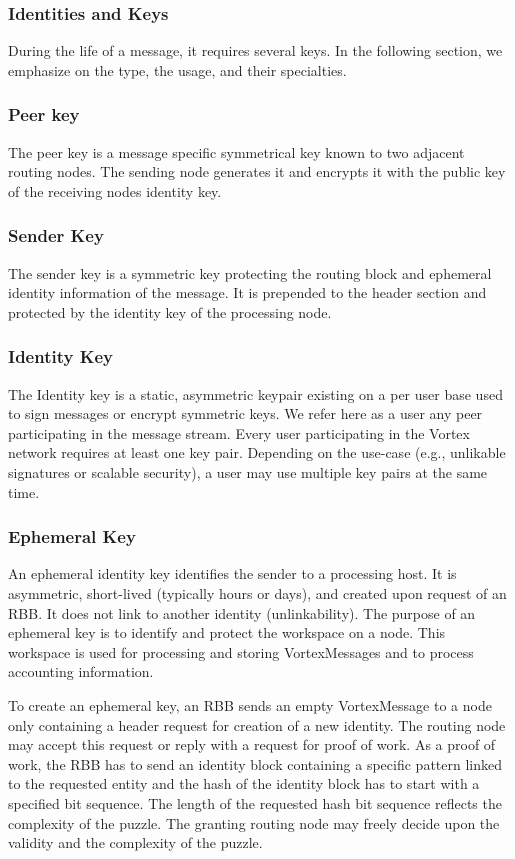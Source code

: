 \documentclass[10pt,journal,compsoc]{IEEEtran}
\begin{document}
\subsubsection{Identities and Keys}
During the life of a message, it requires several keys. In the following section, we emphasize on the type, the usage, and their specialties.

\subsubsection{Peer key}
The peer key is a message specific symmetrical key known to two adjacent routing nodes. The sending node generates it and encrypts it with the public key of the receiving nodes identity key.

\subsubsection{Sender Key}
The sender key is a symmetric key protecting the routing block and ephemeral identity information of the message. It is prepended to the header section and protected by the identity key of the processing node.

\subsubsection{Identity Key}
The Identity key is a static, asymmetric keypair existing on a per user base used to sign messages or encrypt symmetric keys. We refer here as a user any peer participating in the message stream. Every user participating in the Vortex network requires at least one key pair. Depending on the use-case (e.g., unlikable signatures or scalable security), a user may use multiple key pairs at the same time.

\subsubsection{Ephemeral Key}
An ephemeral identity key identifies the sender to a processing host. It is asymmetric, short-lived (typically hours or days), and created upon request of an RBB. It does not link to another identity (unlinkability). The purpose of an ephemeral key is to identify and protect the workspace on a node. This workspace is used for processing and storing VortexMessages and to process accounting information.  

To create an ephemeral key, an RBB sends an empty VortexMessage to a node only containing a header request for creation of a new identity. The routing node may accept this request or reply with a request for proof of work. As a proof of work, the RBB has to send an identity block containing a specific pattern linked to the requested entity and the hash of the identity block has to start with a specified bit sequence. The length of the requested hash bit sequence reflects the complexity of the puzzle. The granting routing node may freely decide upon the validity and the complexity of the puzzle. 
\end{document}
